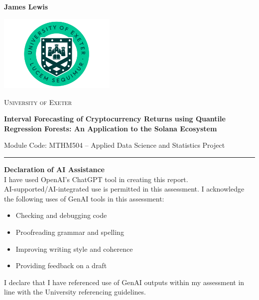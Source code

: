 \begin{titlepage}
    \noindent
    \begin{flushleft}
        \textbf{James Lewis} \\
    \end{flushleft}

    \vspace*{0.8cm}
    \centering

    \centering
    \vspace*{1.5cm}

    \includegraphics[width=0.42\textwidth]{Uni-Exeter-logo-portrait-1.png}\par\vspace{1.2cm}

    {\scshape\Large University of Exeter \par}
    \vspace{1.2cm}

    {\Huge\bfseries Interval Forecasting of Cryptocurrency Returns using Quantile Regression Forests: An Application to the Solana Ecosystem
 \par}
    \vspace{0.6cm}

    {\large Module Code: MTHM504 – Applied Data Science and Statistics Project\par}
    
    \vspace*{0.8cm}

    \small
    \noindent\rule{\textwidth}{0.4pt}
    \vspace{0.2cm}

    \textbf{Declaration of AI Assistance} \\
    I have used OpenAI’s ChatGPT tool in creating this report. \\

    AI-supported/AI-integrated use is permitted in this assessment. I acknowledge the following uses of GenAI tools in this assessment:

    \begin{itemize}\itemsep0pt  
      \item Checking and debugging code
      \item Proofreading grammar and spelling
      \item Improving writing style and coherence
      \item Providing feedback on a draft
    \end{itemize}

    \vspace{-0.2cm}
    I declare that I have referenced use of GenAI outputs within my assessment in line with the University referencing guidelines.

\end{titlepage}
